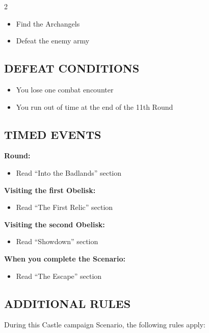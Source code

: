 \begin{multicols}{2}
\begin{itemize}
  \item Find the Archangels
  \item Defeat the enemy army
\end{itemize}


\subsection*{\MakeUppercase{Defeat Conditions}}
\begin{itemize}
  \item You lose one combat encounter
  \item You run out of time at the end of the 11th Round
\end{itemize}

\subsection*{\MakeUppercase{Timed Events}}

\textbf{ Round:}
\begin{itemize}
  \item Read ``Into the Badlands'' section
\end{itemize}

\textbf{Visiting the first Obelisk:}
\begin{itemize}
  \item Read ``The First Relic'' section
\end{itemize}

\textbf{Visiting the second Obelisk:}
\begin{itemize}
  \item Read ``Showdown'' section
\end{itemize}

\textbf{When you complete the Scenario:}
\begin{itemize}
  \item Read ``The Escape'' section
\end{itemize}

\subsection*{\MakeUppercase{Additional rules}}

During this Castle campaign Scenario, the following rules apply:


\end{multicols}

